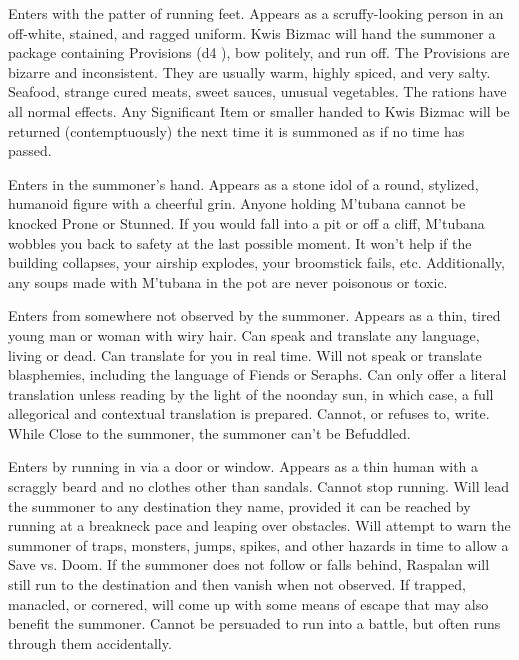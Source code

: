 {
Enters with the patter of running feet. Appears as a scruffy-looking person in an off-white, stained, and ragged uniform. Kwis Bizmac will hand the summoner a package containing \DICE Provisions (d4 \UD), bow politely, and run off. The Provisions are bizarre and inconsistent. They are usually warm, highly spiced, and very salty. Seafood, strange cured meats, sweet sauces, unusual vegetables. The rations have all normal effects. Any Significant Item or smaller handed to Kwis Bizmac will be returned (contemptuously) the next time it is summoned as if no time has passed.


Enters in the summoner's hand. Appears as a stone idol of a round, stylized, humanoid figure with a cheerful grin. Anyone holding M'tubana cannot be knocked Prone or Stunned.  If you would fall into a pit or off a cliff, M'tubana wobbles you back to safety at the last possible moment. It won't help if the building collapses, your airship explodes, your broomstick fails, etc. Additionally, any soups made with M'tubana in the pot are never poisonous or toxic.


Enters from somewhere not observed by the summoner. Appears as a thin, tired young man or woman with wiry hair. Can speak and translate any language, living or dead.  Can translate for you in real time. Will not speak or translate blasphemies, including the language of Fiends or Seraphs.  Can only offer a literal translation unless reading by the light of the noonday sun, in which case, a full allegorical and contextual translation is prepared. Cannot, or refuses to, write.  While Close to the summoner, the summoner can't be Befuddled.


Enters by running in via a door or window. Appears as a thin human with a scraggly beard and no clothes other than sandals. Cannot stop running. Will lead the summoner to any destination they name, provided it can be reached by running at a breakneck pace and leaping over obstacles. Will attempt to warn the summoner of traps, monsters, jumps, spikes, and other hazards in time to allow a Save vs. Doom. If the summoner does not follow or falls behind, Raspalan will still run to the destination and then vanish when not observed. If trapped, manacled, or cornered, will come up with some means of escape that may also benefit the summoner. Cannot be persuaded to run into a battle, but often runs through them accidentally.




}
